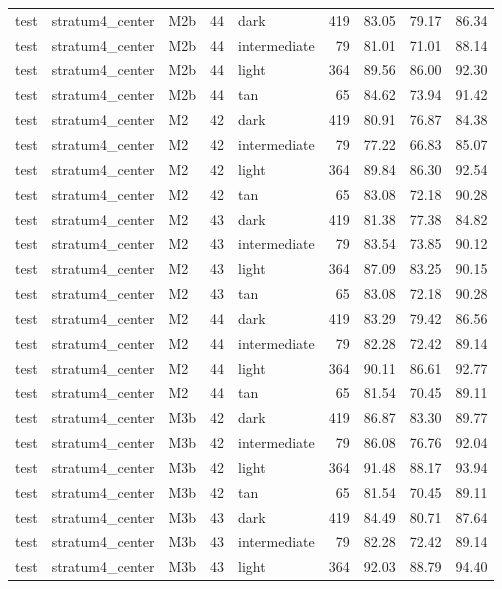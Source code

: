 \begin{tabular}{lllrlrrrr}
test & stratum4\_center & M2b & 44 & dark & 419 & 83.05 & 79.17 & 86.34 \\
test & stratum4\_center & M2b & 44 & intermediate & 79 & 81.01 & 71.01 & 88.14 \\
test & stratum4\_center & M2b & 44 & light & 364 & 89.56 & 86.00 & 92.30 \\
test & stratum4\_center & M2b & 44 & tan & 65 & 84.62 & 73.94 & 91.42 \\
test & stratum4\_center & M2 & 42 & dark & 419 & 80.91 & 76.87 & 84.38 \\
test & stratum4\_center & M2 & 42 & intermediate & 79 & 77.22 & 66.83 & 85.07 \\
test & stratum4\_center & M2 & 42 & light & 364 & 89.84 & 86.30 & 92.54 \\
test & stratum4\_center & M2 & 42 & tan & 65 & 83.08 & 72.18 & 90.28 \\
test & stratum4\_center & M2 & 43 & dark & 419 & 81.38 & 77.38 & 84.82 \\
test & stratum4\_center & M2 & 43 & intermediate & 79 & 83.54 & 73.85 & 90.12 \\
test & stratum4\_center & M2 & 43 & light & 364 & 87.09 & 83.25 & 90.15 \\
test & stratum4\_center & M2 & 43 & tan & 65 & 83.08 & 72.18 & 90.28 \\
test & stratum4\_center & M2 & 44 & dark & 419 & 83.29 & 79.42 & 86.56 \\
test & stratum4\_center & M2 & 44 & intermediate & 79 & 82.28 & 72.42 & 89.14 \\
test & stratum4\_center & M2 & 44 & light & 364 & 90.11 & 86.61 & 92.77 \\
test & stratum4\_center & M2 & 44 & tan & 65 & 81.54 & 70.45 & 89.11 \\
test & stratum4\_center & M3b & 42 & dark & 419 & 86.87 & 83.30 & 89.77 \\
test & stratum4\_center & M3b & 42 & intermediate & 79 & 86.08 & 76.76 & 92.04 \\
test & stratum4\_center & M3b & 42 & light & 364 & 91.48 & 88.17 & 93.94 \\
test & stratum4\_center & M3b & 42 & tan & 65 & 81.54 & 70.45 & 89.11 \\
test & stratum4\_center & M3b & 43 & dark & 419 & 84.49 & 80.71 & 87.64 \\
test & stratum4\_center & M3b & 43 & intermediate & 79 & 82.28 & 72.42 & 89.14 \\
test & stratum4\_center & M3b & 43 & light & 364 & 92.03 & 88.79 & 94.40 \\

\end{tabular}
